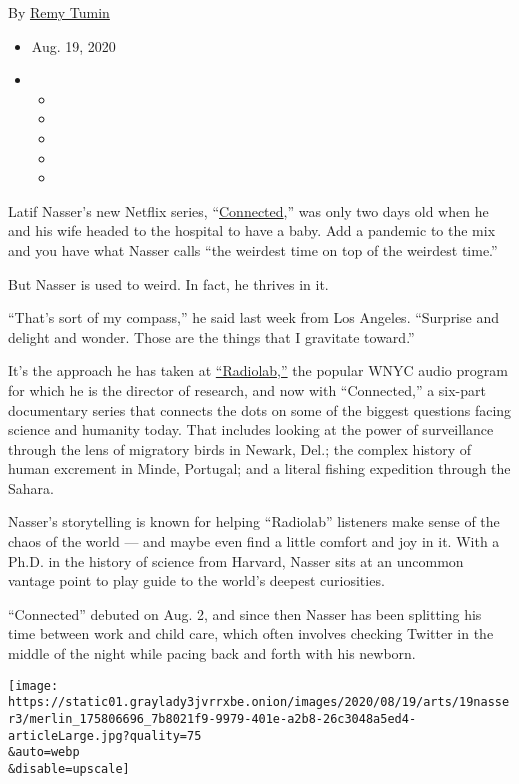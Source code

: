 By \href{https://www.nytimes3xbfgragh.onion/by/remy-tumin}{Remy Tumin}

\begin{itemize}
\item
  Aug. 19, 2020
\item
  \begin{itemize}
  \item
  \item
  \item
  \item
  \item
  \end{itemize}
\end{itemize}

Latif Nasser's new Netflix series,
``\href{https://www.netflix.com/title/81031737}{Connected},'' was only
two days old when he and his wife headed to the hospital to have a baby.
Add a pandemic to the mix and you have what Nasser calls ``the weirdest
time on top of the weirdest time.''

But Nasser is used to weird. In fact, he thrives in it.

``That's sort of my compass,'' he said last week from Los Angeles.
``Surprise and delight and wonder. Those are the things that I gravitate
toward.''

It's the approach he has taken at
\href{https://www.nytimes3xbfgragh.onion/2020/02/03/arts/radiolab-the-other-latif-guantanamo.html}{``Radiolab,''}
the popular WNYC audio program for which he is the director of research,
and now with ``Connected,'' a six-part documentary series that connects
the dots on some of the biggest questions facing science and humanity
today. That includes looking at the power of surveillance through the
lens of migratory birds in Newark, Del.; the complex history of human
excrement in Minde, Portugal; and a literal fishing expedition through
the Sahara.

Nasser's storytelling is known for helping ``Radiolab'' listeners make
sense of the chaos of the world --- and maybe even find a little comfort
and joy in it. With a Ph.D. in the history of science from Harvard,
Nasser sits at an uncommon vantage point to play guide to the world's
deepest curiosities.

``Connected'' debuted on Aug. 2, and since then Nasser has been
splitting his time between work and child care, which often involves
checking Twitter in the middle of the night while pacing back and forth
with his newborn.

\texttt{[image: https://static01.graylady3jvrrxbe.onion/images/2020/08/19/arts/19nasser3/merlin\_175806696\_7b8021f9-9979-401e-a2b8-26c3048a5ed4-articleLarge.jpg?quality=75\\\&auto=webp\\\&disable=upscale]}

